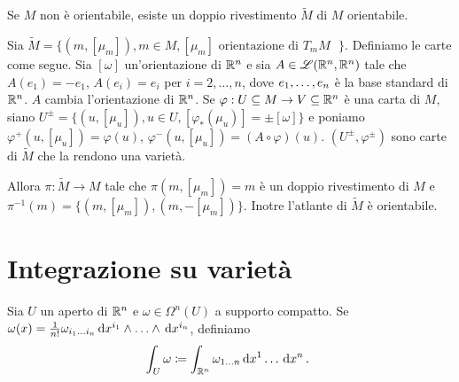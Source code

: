 \begin{remark}
	Se $M$ non è orientabile, esiste un doppio rivestimento $\tilde M$ di $M$ orientabile.
	
	Sia $\tilde M = \{ (m,[\mu_m]), m\in M, \text{$[\mu_m]$ orientazione di $T_mM$ } \}$. Definiamo le carte come segue. Sia $[\omega]$ un'orientazione di $\R^n$ e sia $A\in\Lin(\R^n,\R^n)$ tale che $A(e_1) = -e_1$, $A(e_i) = e_i$ per $i=2,\ldots,n$, dove $\seqb en,$ è la base standard di $\R^n$. $A$ cambia l'orientazione di $\R^n$.
	Se $\varphi:U\subseteq M \to V\subseteq \R^n$ è una carta di $M$, siano $U^\pm = \{ (u,[\mu_u]), u \in U, [\varphi_*(\mu_u)] = \pm[\omega] \}$ e poniamo $\varphi^+(u,[\mu_u]) = \varphi(u)$, $\varphi^-(u,[\mu_u]) = (A\circ\varphi)(u)$.
	$(U^\pm,\varphi^\pm)$ sono carte di $\tilde M$ che la rendono una varietà.
	
	Allora $\pi:\tilde M\to M$ tale che $\pi(m, [\mu_m]) = m$ è un doppio rivestimento di $M$ e $\pi^{-1}(m) = \{ (m,[\mu_m] ), (m,-[\mu_m]) \}$. Inotre l'atlante di $\tilde M$ è orientabile.
\end{remark}


\section{Integrazione su varietà}

\begin{definition}
	Sia $U$ un aperto di $\R^n$ e $\omega\in\Omega^n(U)$ a supporto compatto. Se $\omega(x) = \frac 1{n!} \omega_{\seqb in{}} \de x^{i_1}\wedge \ldots \wedge \de x^{i_n}$, definiamo
	\begin{equation*}
		\int_U \omega \coloneqq \int_{\R^n} \omega_{1 \ldots n} \seqa {\de x}n{} \punto 
	\end{equation*}
\end{definition}

